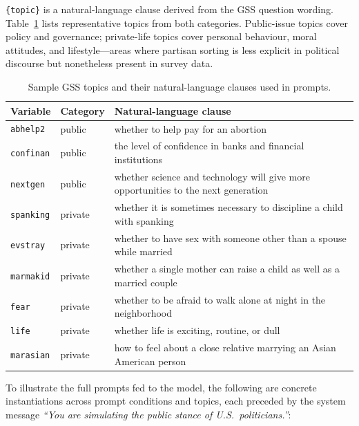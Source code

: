 \texttt{\{topic\}} is a natural-language clause derived from the GSS question wording. Table~\ref{tab:topic_examples} lists representative topics from both categories. Public-issue topics cover policy and governance; private-life topics cover personal behaviour, moral attitudes, and lifestyle---areas where partisan sorting is less explicit in political discourse but nonetheless present in survey data.

\begin{table}[ht]
\centering
\small
\caption{Sample GSS topics and their natural-language clauses used in prompts.}
\label{tab:topic_examples}
\begin{tabular}{llp{8cm}}
\toprule
Variable & Category & Natural-language clause \\
\midrule
\texttt{abhelp2}  & public  & whether to help pay for an abortion \\
\texttt{confinan} & public  & the level of confidence in banks and financial institutions \\
\texttt{nextgen}  & public  & whether science and technology will give more opportunities to the next generation \\
\midrule
\texttt{spanking}  & private & whether it is sometimes necessary to discipline a child with spanking \\
\texttt{evstray}   & private & whether to have sex with someone other than a spouse while married \\
\texttt{marmakid}  & private & whether a single mother can raise a child as well as a married couple \\
\texttt{fear}      & private & whether to be afraid to walk alone at night in the neighborhood \\
\texttt{life}      & private & whether life is exciting, routine, or dull \\
\texttt{marasian}  & private & how to feel about a close relative marrying an Asian American person \\
\bottomrule
\end{tabular}
\end{table}

To illustrate the full prompts fed to the model, the following are concrete instantiations across prompt conditions and topics, each preceded by the system message \textit{``You are simulating the public stance of U.S.\ politicians.''}:

